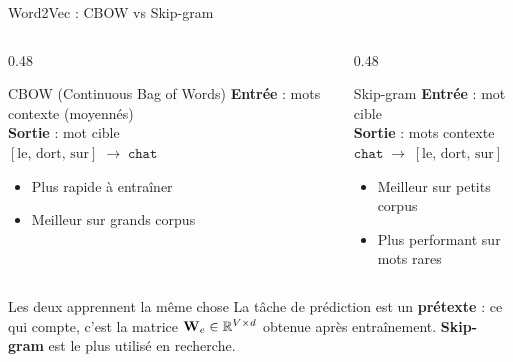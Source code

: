\documentclass[aspectratio=169, 10pt]{beamer}
\begin{document}
\begin{frame}{Word2Vec : CBOW vs Skip-gram}
  \begin{columns}[T]
    \begin{column}{0.48\textwidth}
      \begin{block}{CBOW \small(Continuous Bag of Words)}
        \textbf{Entrée} : mots contexte (moyennés)\\
        \textbf{Sortie} : mot cible\\[4pt]
        \centering\small
        $[\text{le},\, \text{dort},\, \text{sur}] \;\to\; \texttt{chat}$
        \begin{itemize}
          \item Plus rapide à entraîner
          \item Meilleur sur grands corpus
        \end{itemize}
      \end{block}
    \end{column}
    \begin{column}{0.48\textwidth}
      \begin{block}{Skip-gram}
        \textbf{Entrée} : mot cible\\
        \textbf{Sortie} : mots contexte\\[4pt]
        \centering\small
        $\texttt{chat} \;\to\; [\text{le},\, \text{dort},\, \text{sur}]$
        \begin{itemize}
          \item Meilleur sur petits corpus
          \item Plus performant sur mots rares
        \end{itemize}
      \end{block}
    \end{column}
  \end{columns}
  \bigskip
  \begin{exampleblock}{Les deux apprennent la même chose}
    La tâche de prédiction est un \textbf{prétexte} : ce qui compte, c'est la matrice
    $\mathbf{W}_e \in \mathbb{R}^{V \times d}$ obtenue après entraînement.
    \textbf{Skip-gram} est le plus utilisé en recherche.
  \end{exampleblock}
\end{frame}
\end{document}
